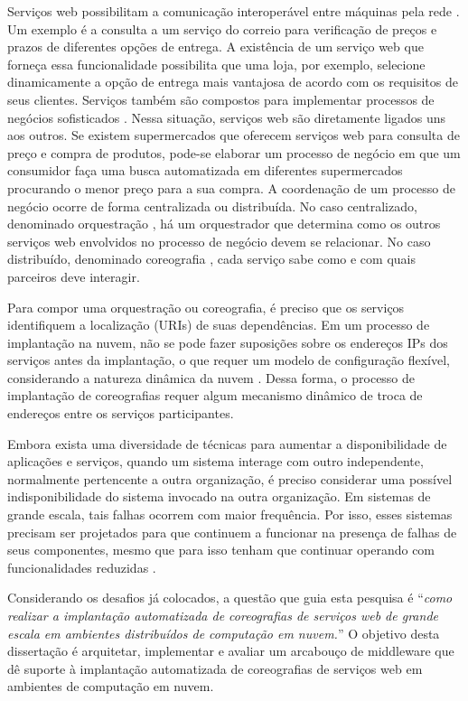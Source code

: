 Serviços web possibilitam a comunicação interoperável entre máquinas pela rede \cite{W3C2004WS}. Um exemplo é a consulta a um serviço do correio para verificação de preços e prazos de diferentes opções de entrega. A existência de um serviço web que forneça essa funcionalidade possibilita que uma loja, por exemplo, selecione dinamicamente a opção de entrega mais vantajosa de acordo com os requisitos de seus clientes. Serviços também são compostos para implementar processos de negócios sofisticados \cite{Papazoglou2007State}. Nessa situação, serviços web são diretamente ligados uns aos outros. Se existem supermercados que oferecem serviços web para consulta de preço e compra de produtos, pode-se elaborar um processo de negócio em que um consumidor faça uma busca automatizada em diferentes supermercados procurando o menor preço para a sua compra. A coordenação de um processo de negócio ocorre de forma centralizada ou distribuída. No caso centralizado, denominado orquestração \cite{Nanda2004Decentralizing}, há um orquestrador que determina como os outros serviços web envolvidos no processo de negócio devem se relacionar. No caso distribuído, denominado coreografia \cite{Barker2009Choreographing}, cada serviço sabe como e com quais parceiros deve interagir. 

Para compor uma orquestração ou coreografia, é preciso que os serviços identifiquem a localização (URIs) de suas dependências. Em um processo de implantação na nuvem, não se pode fazer suposições sobre os endereços IPs dos serviços antes da implantação, o que requer um modelo de configuração flexível, considerando a natureza dinâmica da nuvem \cite{Amazon2012Practices}. Dessa forma, o processo de implantação de coreografias requer algum mecanismo dinâmico de troca de endereços entre os serviços participantes. 

Embora exista uma diversidade de técnicas para aumentar a disponibilidade de aplicações e serviços, quando um sistema interage com outro independente, normalmente pertencente a outra organização, é preciso considerar uma possível indisponibilidade do sistema invocado na outra organização. Em sistemas de grande escala, tais falhas ocorrem com maior frequência. Por isso, esses sistemas precisam ser projetados para que continuem a funcionar na presença de falhas de seus componentes, mesmo que para isso tenham que continuar operando com funcionalidades reduzidas \cite{Hamilton2007InternetScale,  Helland2009Quicksand}.

Considerando os desafios já colocados, a questão que guia esta pesquisa é ``\emph{como realizar a implantação automatizada de coreografias de serviços web de grande escala em ambientes distribuídos de computação em nuvem.}'' O objetivo desta dissertação é arquitetar, implementar e avaliar um arcabouço de middleware que dê suporte à implantação automatizada de coreografias de serviços web em ambientes de computação em nuvem. 

